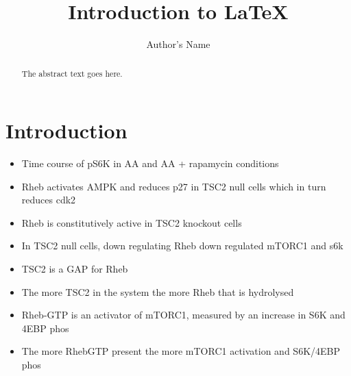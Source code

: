 \documentclass{article}
\begin{document}
\title{Introduction to \LaTeX{}}
\author{Author's Name}

\maketitle

\begin{abstract}
The abstract text goes here.
\end{abstract}

\section{Introduction}

	\begin{itemize}
		\item Time course of pS6K in AA and AA + rapamycin conditions \cite{Patursky-Polischuk2014}
		\item Rheb activates AMPK and reduces p27 in TSC2 null  cells which in turn reduces cdk2 \cite{lacher2010rheb}
		\item Rheb is constitutively active in TSC2 knockout cells \cite{lacher2010rheb}
		\item In TSC2 null cells, down regulating Rheb down regulated mTORC1 and s6k
		\item TSC2 is a GAP for Rheb~\cite{Inoki2003}
		\item The more TSC2 in the system the more Rheb that is hydrolysed \cite{Inoki2003}
		\item Rheb-GTP is an activator of mTORC1, measured by an increase in S6K and 4EBP phos
		\item The more RhebGTP present the more mTORC1 activation and S6K/4EBP phos \cite{Inoki2003}
	\end{itemize}
%
\end{document}
